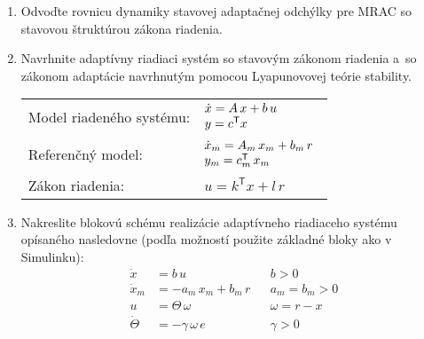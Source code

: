 \documentclass[a4paper, 10pt, ]{article}
\begin{document}
\begin{enumerate}[leftmargin=0pt, labelsep=4mm, itemsep=0pt]
    \item Odvoďte rovnicu dynamiky stavovej adaptačnej odchýlky pre MRAC so stavovou štruktúrou zákona riadenia.


    \item Navrhnite adaptívny riadiaci systém so stavovým zákonom riadenia a~so zákonom adaptácie navrhnutým pomocou Lyapunovovej teórie stability.

    	\begin{tabular}{@{}l l}
    	Model riadeného systému: & $\begin{array}{@{}l} \dot{x} = A\,x+ b\,u\\   y = c^\mathsf{T}x \end{array}$ \vspace{1.5mm}\\
    	Referenčný model: & $\begin{array}{@{}l} \dot{x}_m = A_m\,x_m + b_m\,r\\   y_m = c^\mathsf{T}_m\,x_m \end{array}$ \vspace{2.5mm} \\
    	Zákon riadenia: & $u = k^\mathsf{T} x + l\,r$
    	\end{tabular}



        \item Nakreslite blokovú schému realizácie adaptívneho riadiaceho systému opísaného nasledovne (podľa možností použite základné bloky ako v Simulinku):
        \begin{align*}
            \dot{x} &= b\,u & &b>0 \\
            \dot{x}_m &= -a_m\,x_m + b_m\,r & &a_m = b_m > 0 \\
            u &= \Theta \, \omega & & \omega = r - x \\
            \dot{\Theta} &= - \gamma\,\omega\,e & &\gamma > 0
        \end{align*}




\end{enumerate}
\end{document}
